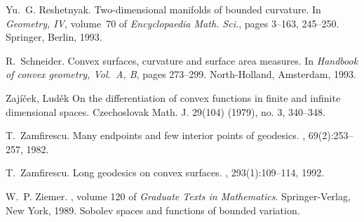 \documentclass[12pt,leqno,intlimits]{amsart}
\numberwithin{equation}{section}
\theoremstyle{definition}
\theoremstyle{remark}
\begin{document}
\begin{thebibliography}{KMS01}
Yu.~G. Reshetnyak.
\newblock Two-dimensional manifolds of bounded curvature.
\newblock In {\em Geometry, {IV}}, volume~70 of {\em Encyclopaedia Math. Sci.},
pages 3--163, 245--250. Springer, Berlin, 1993.

R.~Schneider.
\newblock Convex surfaces, curvature and surface area measures.
\newblock In {\em Handbook of convex geometry, {V}ol.\ {A}, {B}}, pages
273--299. North-Holland, Amsterdam, 1993.

Zaj\'i\v{c}ek, Lud\v{e}k
On the differentiation of convex functions in finite and infinite dimensional spaces.
Czechoslovak Math. J. 29(104) (1979), no. 3, 340--348.

T.~Zamfirescu.
\newblock Many endpoints and few interior points of geodesics.
, 69(2):253--257, 1982.

T.~Zamfirescu.
\newblock Long geodesics on convex surfaces.
, 293(1):109--114, 1992.

W.~P. Ziemer.
, volume 120 of {\em Graduate
Texts in Mathematics}.
\newblock Springer-Verlag, New York, 1989.
\newblock Sobolev spaces and functions of bounded variation.

\end{thebibliography}
\end{document}
